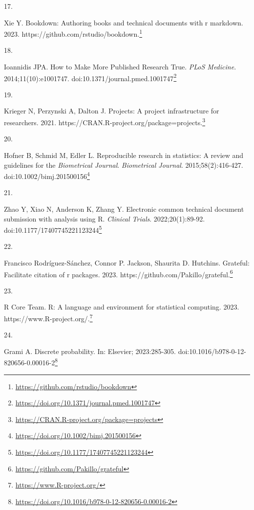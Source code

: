 \documentclass[
  a4paper,
]{book}
\newlength{\cslhangindent}
\newlength{\csllabelwidth}
\newlength{\cslentryspacingunit} %
\newenvironment{CSLReferences}[2] %
 {%
  \setlength{\parindent}{0pt}
  \ifodd #1
  \let\oldpar\par
  \def\par{\hangindent=\cslhangindent\oldpar}
  \fi
  \setlength{\parskip}{#2\cslentryspacingunit}
 }%
 {}
\newcommand{\CSLLeftMargin}[1]{\parbox[t]{\csllabelwidth}{#1}}
\newcommand{\CSLRightInline}[1]{\parbox[t]{\linewidth - \csllabelwidth}{#1}\break}
\renewcommand{\href}[2]{#2\footnote{\url{#1}}}
\begin{document}
\begin{CSLReferences}{0}{0}
\leavevmode{}%
\CSLLeftMargin{17. }%
\CSLRightInline{Xie Y. Bookdown: Authoring books and technical documents with r markdown. 2023. \href{https://github.com/rstudio/bookdown}{https://github.com/rstudio/bookdown.}}

\leavevmode{}%
\CSLLeftMargin{18. }%
\CSLRightInline{Ioannidis JPA. How to Make More Published Research True. \emph{PLoS Medicine}. 2014;11(10):e1001747. doi:\href{https://doi.org/10.1371/journal.pmed.1001747}{10.1371/journal.pmed.1001747}}

\leavevmode{}%
\CSLLeftMargin{19. }%
\CSLRightInline{Krieger N, Perzynski A, Dalton J. Projects: A project infrastructure for researchers. 2021. \href{https://CRAN.R-project.org/package=projects}{https://CRAN.R-project.org/package=projects.}}

\leavevmode{}%
\CSLLeftMargin{20. }%
\CSLRightInline{Hofner B, Schmid M, Edler L. Reproducible research in statistics: A review and guidelines for the {\emph{Biometrical Journal}}. \emph{Biometrical Journal}. 2015;58(2):416-427. doi:\href{https://doi.org/10.1002/bimj.201500156}{10.1002/bimj.201500156}}

\leavevmode{}%
\CSLLeftMargin{21. }%
\CSLRightInline{Zhao Y, Xiao N, Anderson K, Zhang Y. Electronic common technical document submission with analysis using R. \emph{Clinical Trials}. 2022;20(1):89-92. doi:\href{https://doi.org/10.1177/17407745221123244}{10.1177/17407745221123244}}

\leavevmode{}%
\CSLLeftMargin{22. }%
\CSLRightInline{Francisco Rodríguez-Sánchez, Connor P. Jackson, Shaurita D. Hutchins. Grateful: Facilitate citation of r packages. 2023. \href{https://github.com/Pakillo/grateful}{https://github.com/Pakillo/grateful.}}

\leavevmode{}%
\CSLLeftMargin{23. }%
\CSLRightInline{R Core Team. R: A language and environment for statistical computing. 2023. \href{https://www.R-project.org/}{https://www.R-project.org/.}}

\leavevmode{}%
\CSLLeftMargin{24. }%
\CSLRightInline{Grami A. Discrete probability. In: Elsevier; 2023:285-305. doi:\href{https://doi.org/10.1016/b978-0-12-820656-0.00016-2}{10.1016/b978-0-12-820656-0.00016-2}}


\end{CSLReferences}
\end{document}
